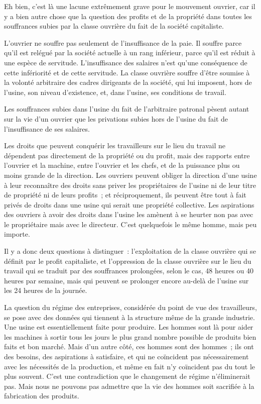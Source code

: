 \documentclass[french,twoside]{book} %
\begin{document}
Eh bien, c'est là une lacune extrêmement grave pour le mouvement ouvrier, car il y a bien autre chose que la question des profits et de la propriété dans toutes les souffrances subies par la classe ouvrière du fait de la société capitaliste.\par
L'ouvrier ne souffre pas seulement de l'insuffisance de la paie. Il souffre parce qu'il est relégué par la société actuelle à un rang inférieur, parce qu'il est réduit à une espèce de servitude. L'insuffisance des salaires n'est qu'une conséquence de cette infériorité et de cette servitude. La classe ouvrière souffre d'être soumise à la volonté arbitraire des cadres dirigeants de la société, qui lui imposent, hors de l'usine, son niveau d'existence, et, dans l'usine, ses conditions de travail.\par
Les souffrances subies dans l'usine du fait de l'arbitraire patronal pèsent autant sur la vie d'un ouvrier que les privations subies hors de l'usine du fait de l'insuffisance de ses salaires.\par
\par
Les droits que peuvent conquérir les travailleurs sur le lieu du travail ne dépendent pas directement de la propriété ou du profit, mais des rapports entre l'ouvrier et la machine, entre l'ouvrier et les chefs, et de la puissance plus ou moins grande de la direction. Les ouvriers peuvent obliger la direction d'une usine à leur reconnaître des droits sans priver les propriétaires de l'usine ni de leur titre de propriété ni de leurs profits ; et réciproquement, ils peuvent être tout à fait privés de droits dans une usine qui serait une propriété collective. Les aspirations des ouvriers à avoir des droits dans l'usine les amènent à se heurter non pas avec le propriétaire mais avec le directeur. C'est quelquefois le même homme, mais peu importe.\par
Il y a donc deux questions à distinguer : l'exploitation de la classe ouvrière qui se définit par le profit capitaliste, et l'oppression de la classe ouvrière sur le lieu du travail qui se traduit par des souffrances prolongées, selon le cas, 48 heures ou 40 heures par semaine, mais qui peuvent se prolonger encore au-delà de l'usine sur les 24 heures de la journée.\par
La question du régime des entreprises, considérée du point de vue des travailleurs, se pose avec des données qui tiennent à la structure même de la grande industrie. Une usine est essentiellement faite pour produire. Les hommes sont là pour aider les machines à sortir tous les jours le plus grand nombre possible de produits bien faits et bon marché. Mais d'un autre côté, ces hommes sont des hommes ; ils ont des besoins, des aspirations à satisfaire, et qui ne coïncident pas nécessairement avec les nécessités de la production, et même en fait n'y coïncident pas du tout le plus souvent. C'est une contradiction que le changement de régime n'éliminerait pas. Mais nous ne pouvons pas admettre que la vie des hommes soit sacrifiée à la fabrication des produits.\par
\end{document}
